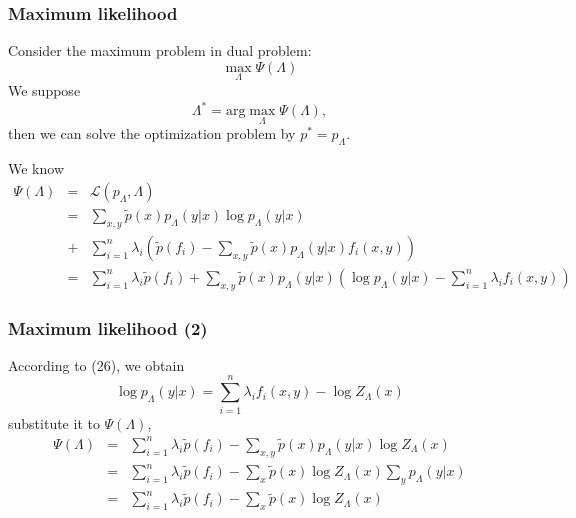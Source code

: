 \documentclass[slidestop,compress,mathserif]{beamer}
\begin{document}
	\begin{frame}[shrink]
		\frametitle{Maximum likelihood}
		Consider the maximum problem in dual problem:
		\begin{equation}
			\max_\Lambda \Psi(\Lambda)
		\end{equation}
		We suppose
		\begin{equation}
			\Lambda^* = \mathrm{arg}\max_\Lambda \Psi(\Lambda),
		\end{equation}
		then we can solve the optimization problem by $p^* = p_\Lambda$.
		
		We know
		\begin{eqnarray*}
			\Psi(\Lambda) &=& \mathcal{L}(p_\Lambda,\Lambda)\\
			&=&\sum_{x,y}\widetilde{p}(x)p_\Lambda(y|x)\log p_\Lambda(y|x) \\
			&+& \sum_{i=1}^{n}\lambda_i\left(\widetilde{p}(f_i) - \sum_{x,y}\widetilde{p}(x)p_\Lambda(y|x)f_i(x,y)\right)\\
			&=& \sum_{i=1}^{n} \lambda_i\widetilde{p}(f_i) +\sum_{x,y}\widetilde{p}(x)p_\Lambda(y|x)\left(\log p_\Lambda(y|x) - \sum_{i=1}^{n}\lambda_if_i(x,y)\right)
		\end{eqnarray*}
	\end{frame}
	
	\begin{frame}
		\frametitle{Maximum likelihood (2)}
		According to (26), we obtain
		\begin{equation}
			\log p_\Lambda(y|x) = \sum_{i=1}^{n}\lambda_i f_i(x,y) - \log Z_\Lambda(x)
		\end{equation}
		substitute it to $\Psi(\Lambda)$,
		\begin{eqnarray*}
			\Psi(\Lambda) &=& \sum_{i=1}^{n}\lambda_i\widetilde{p}(f_i)-\sum_{x,y}\widetilde{p}(x)p_\Lambda(y|x)\log Z_\Lambda(x) \\
			&=& \sum_{i=1}^{n}\lambda_i\widetilde{p}(f_i) - \sum_x \widetilde{p}(x)\log Z_\Lambda(x)\sum_y p_\Lambda(y|x)\\
			&=& \sum_{i=1}^{n}\lambda_i\widetilde{p}(f_i) - \sum_x\widetilde{p}(x)\log Z_\Lambda(x)
		\end{eqnarray*}
	\end{frame}
	
\end{document}
